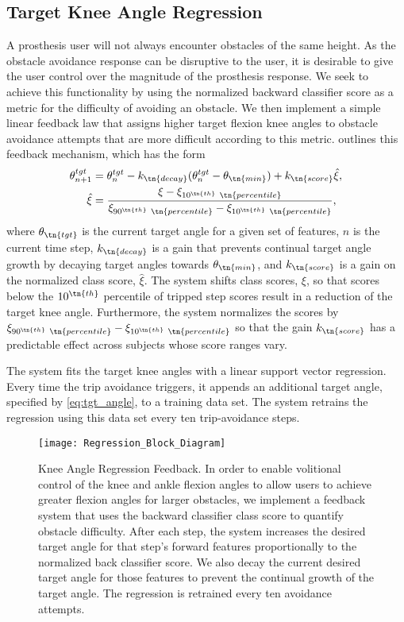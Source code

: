 \subsection{Target Knee Angle Regression}

A prosthesis user will not always encounter obstacles of the same height. As the
obstacle avoidance response can be disruptive to the user, it is desirable to
give the user control over the magnitude of the prosthesis response. We seek to
achieve this functionality by using the normalized backward classifier score as
a metric for the difficulty of avoiding an obstacle. We then implement a simple
linear feedback law that assigns higher target flexion knee angles to obstacle
avoidance attempts that are more difficult according to this metric.
 outlines this feedback mechanism, which has the form
\begin{align}
    \theta_{n+1}^{tgt} &= \theta_{n}^{tgt} - k_\tn{decay}(\theta_{n}^{tgt} 
        - \theta_\tn{min})     + k_\tn{score} \hat{\xi},\label{eq:tgt_angle}\\
    \hat{\xi} &= \frac{\xi - \xi_{10^\tn{th} \ \tn{percentile}}}{
        \xi_{90^\tn{th} \ \tn{percentile}} - \xi_{10^\tn{th} \ \tn{percentile}}},
        \label{eq:score_norm}
\end{align}
where $\theta_\tn{tgt}$ is the current target angle for a given set of features,
$n$ is the current time step, $k_\tn{decay}$ is a gain that prevents continual
target angle growth by decaying target angles towards $\theta_\tn{min}$, and
$k_\tn{score}$ is a gain on the normalized class score, $\hat{\xi}$. The system
shifts class scores, $\xi$, so that scores below the $10^\tn{th}$ percentile of
tripped step scores result in a reduction of the target knee angle. Furthermore,
the system normalizes the scores by $\xi_{90^\tn{th} \ \tn{percentile}} -
\xi_{10^\tn{th} \ \tn{percentile}}$ so that the gain $k_\tn{score}$ has a
predictable effect across subjects whose score ranges vary. 

The system fits the target knee angles with a linear support vector regression.
Every time the trip avoidance triggers, it appends an additional target angle,
specified by \cref{eq:tgt_angle}, to a training data set. The system retrains
the regression using this data set every ten trip-avoidance steps.

\begin{figure}[tb]
    \centerline{\texttt{[image: Regression\_Block\_Diagram]}}
    \caption[Knee Angle Regression Feedback]{Knee Angle Regression Feedback. In
    order to enable volitional control of the knee and ankle flexion angles to
    allow users to achieve greater flexion angles for larger obstacles, we
    implement a feedback system that uses the backward classifier class score to
    quantify obstacle difficulty. After each step, the system increases the
    desired target angle for that step's forward features proportionally to the
    normalized back classifier score. We also decay the current desired target
    angle for those features to prevent the continual growth of the target
    angle. The regression is retrained every ten avoidance
    attempts.}\label{fig:knee_reg}
\end{figure}

